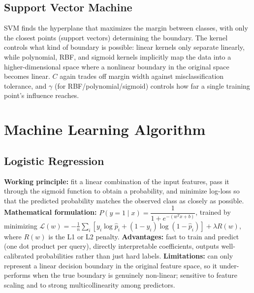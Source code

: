 \documentclass[11pt,a4paper]{article}
\begin{document}
\subsection{Support Vector Machine}
SVM finds the hyperplane that maximizes the margin between classes, with only the closest points (support vectors) determining the boundary. The kernel controls what kind of boundary is possible: linear kernels only separate linearly, while polynomial, RBF, and sigmoid kernels implicitly map the data into a higher-dimensional space where a nonlinear boundary in the original space becomes linear. $C$ again trades off margin width against misclassification tolerance, and $\gamma$ (for RBF/polynomial/sigmoid) controls how far a single training point's influence reaches.

\section{Machine Learning Algorithm}

\subsection{Logistic Regression}
\textbf{Working principle:} fit a linear combination of the input features, pass it through the sigmoid function to obtain a probability, and minimize log-loss so that the predicted probability matches the observed class as closely as possible.
\textbf{Mathematical formulation:} $P(y=1\mid x) = \dfrac{1}{1+e^{-(w^Tx+b)}}$, trained by minimizing $\mathcal{L}(w) = -\frac{1}{n}\sum_i \left[y_i\log \hat p_i + (1-y_i)\log(1-\hat p_i)\right] + \lambda R(w)$, where $R(w)$ is the L1 or L2 penalty.
\textbf{Advantages:} fast to train and predict (one dot product per query), directly interpretable coefficients, outputs well-calibrated probabilities rather than just hard labels.
\textbf{Limitations:} can only represent a linear decision boundary in the original feature space, so it under-performs when the true boundary is genuinely non-linear; sensitive to feature scaling and to strong multicollinearity among predictors.
\end{document}
